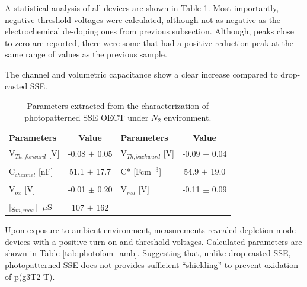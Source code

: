 A statistical analysis of all devices are shown in Table \ref{tab:photofom}. Most importantly, negative threshold voltages were calculated, although not as negative as the electrochemical de-doping ones from previous subsection. Although, peaks close to zero are reported, there were some that had a positive reduction peak at the same range of values as the previous sample. 

The channel and volumetric capacitance show a clear increase compared to drop-casted SSE. %


\begin{table}[ht]
\centering
\caption{Parameters extracted from the characterization of photopatterned SSE OECT under $N_{2}$ environment.}
\begin{tabular}{l|c||l|c}
Parameters & Value & Parameters & Value \\\hline \hline
V$_{Th,forward}$ [V] & -0.08 $\pm$ 0.05 & V$_{Th,backward}$ [V] & -0.09 $\pm$ 0.04\\
& & &\\[-1em]
C$_{channel}$ [nF] & 51.1 $\pm$ 17.7 & C* [Fcm$^{-3}$] & 54.9 $\pm$ 19.0 \\
& & &\\[-1em]
V$_{ox}$ [V] & -0.01 $\pm$ 0.20 & V$_{red}$ [V] & -0.11 $\pm$ 0.09  \\
& & &\\[-1em]
|g$_{m,max}$| [$\mu$S] & 107 $\pm$ 162 &  &\\\hline
\end{tabular}
\label{tab:photofom}
\end{table}

Upon exposure to ambient environment, measurements revealed depletion-mode devices with a positive turn-on and threshold voltages. Calculated parameters are shown in Table \ref{tab:photofom_amb}. Suggesting that, unlike drop-casted SSE, photopatterned SSE does not provides sufficient ``shielding'' to prevent oxidation of p(g3T2-T).

